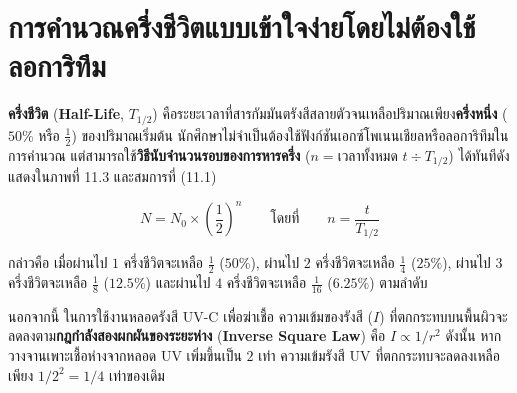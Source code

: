 \vspace{4pt}


\section{การคำนวณครึ่งชีวิตแบบเข้าใจง่ายโดยไม่ต้องใช้ลอการิทึม}


\textbf{ครึ่งชีวิต} (\textbf{Half-Life}, $T_{1/2}$) คือระยะเวลาที่สารกัมมันตรังสีสลายตัวจนเหลือปริมาณเพียง\textbf{ครึ่งหนึ่ง} ($50\%$ หรือ $\frac{1}{2}$) ของปริมาณเริ่มต้น นักศึกษาไม่จำเป็นต้องใช้ฟังก์ชันเอกซ์โพเนนเชียลหรือลอการิทึมในการคำนวณ แต่สามารถใช้\textbf{วิธีนับจำนวนรอบของการหารครึ่ง} ($n = \text{เวลาทั้งหมด } t \div T_{1/2}$) ได้ทันทีดังแสดงใน\mbox{ภาพที่} 11.3 และสมการที่ (11.1)

\begin{equation}
    N = N_0 \times \left(\frac{1}{2}\right)^n \qquad \text{โดยที่} \qquad n = \frac{t}{T_{1/2}}
\end{equation}

กล่าวคือ เมื่อผ่านไป $1$ ครึ่งชีวิตจะเหลือ $\frac{1}{2}$ ($50\%$), ผ่านไป $2$ ครึ่งชีวิตจะเหลือ $\frac{1}{4}$ ($25\%$), ผ่านไป $3$ ครึ่งชีวิตจะเหลือ $\frac{1}{8}$ ($12.5\%$) และผ่านไป $4$ ครึ่งชีวิตจะเหลือ $\frac{1}{16}$ ($6.25\%$) ตามลำดับ

นอกจากนี้ ในการใช้งานหลอดรังสี UV-C เพื่อฆ่าเชื้อ ความเข้มของรังสี ($I$) ที่ตกกระทบบนพื้นผิวจะลดลงตาม\textbf{กฎกำลังสองผกผันของระยะห่าง} (\textbf{Inverse Square Law}) คือ $I \propto 1/r^2$ ดังนั้น หากวางจานเพาะเชื้อห่างจากหลอด UV เพิ่มขึ้นเป็น $2$ เท่า ความเข้มรังสี UV ที่ตกกระทบจะลดลงเหลือเพียง $1/2^2 = 1/4$ เท่าของเดิม

